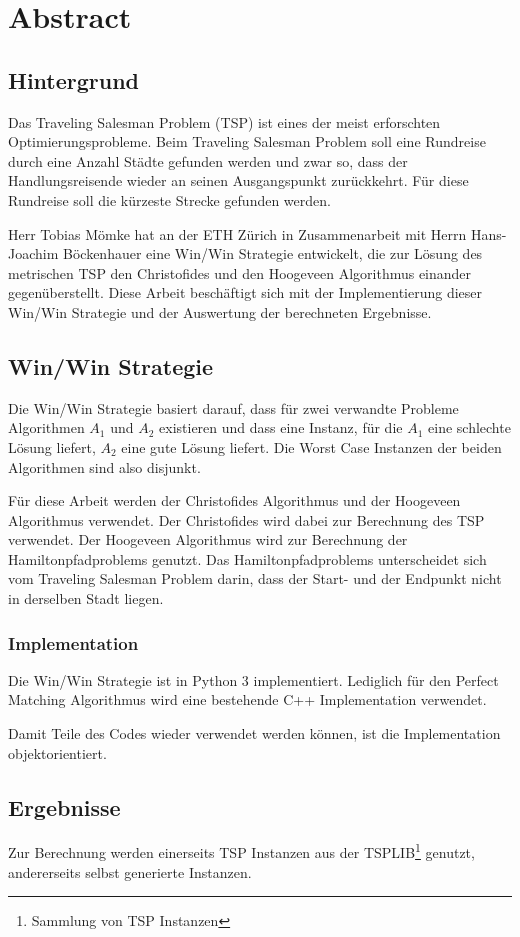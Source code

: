 \documentclass[11pt,a4paper]{article}
\begin{document}
\section{Abstract}
\subsection{Hintergrund}
Das Traveling Salesman Problem (TSP) ist eines der meist erforschten Optimierungsprobleme. Beim Traveling Salesman Problem soll eine Rundreise durch eine Anzahl Städte gefunden werden und zwar so, dass der Handlungsreisende wieder an seinen Ausgangspunkt zurückkehrt. Für diese Rundreise soll die kürzeste Strecke gefunden werden. 

Herr Tobias Mömke hat an der ETH Zürich in Zusammenarbeit mit Herrn Hans-Joachim Böckenhauer eine Win/Win Strategie entwickelt, die zur Lösung des metrischen TSP den Christofides und den Hoogeveen Algorithmus einander gegenüberstellt. Diese Arbeit beschäftigt sich mit der Implementierung dieser Win/Win Strategie und der Auswertung der berechneten Ergebnisse.

\subsection{Win/Win Strategie}
Die Win/Win Strategie basiert darauf, dass für zwei verwandte Probleme Algorithmen $A_1$ und $A_2$ existieren und dass eine Instanz, für die $A_1$ eine schlechte Lösung liefert, $A_2$ eine gute Lösung liefert. Die Worst Case Instanzen der beiden Algorithmen sind also disjunkt.

Für diese Arbeit werden der Christofides Algorithmus und der Hoogeveen Algorithmus verwendet. Der Christofides wird dabei zur Berechnung des TSP verwendet. Der Hoogeveen Algorithmus wird zur Berechnung der Hamiltonpfadproblems genutzt. Das Hamiltonpfadproblems unterscheidet sich vom Traveling Salesman Problem darin, dass der Start- und der Endpunkt nicht in derselben Stadt liegen.

\subsubsection{Implementation}
Die Win/Win Strategie ist in Python 3 implementiert. Lediglich für den Perfect Matching Algorithmus wird eine bestehende C++ Implementation verwendet.

Damit Teile des Codes wieder verwendet werden können, ist die Implementation objektorientiert. 

\subsection{Ergebnisse}
Zur Berechnung werden einerseits TSP Instanzen aus der TSPLIB\footnote{Sammlung von TSP Instanzen} genutzt, andererseits selbst generierte Instanzen.
\end{document}
